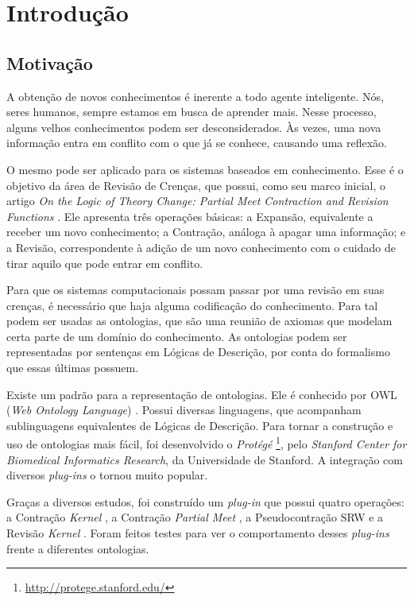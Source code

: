 \chapter{Introdução}

\section{Motivação}

A obtenção de novos conhecimentos é inerente a todo agente inteligente. Nós, seres humanos, sempre estamos em busca de aprender mais. Nesse processo, alguns velhos conhecimentos podem ser desconsiderados. Às vezes, uma nova informação entra em conflito com o que já se conhece, causando uma reflexão.

O mesmo pode ser aplicado para os sistemas baseados em conhecimento. Esse é o objetivo da área de Revisão de Crenças, que possui, como seu marco inicial, o artigo \textit{On the Logic of Theory Change: Partial Meet Contraction and Revision Functions} \citep{revisaoAGM}. Ele apresenta três operações básicas: a Expansão, equivalente a receber um novo conhecimento; a Contração, análoga à apagar uma informação; e a Revisão, correspondente à adição de um novo conhecimento com o cuidado de tirar aquilo que pode entrar em conflito.

Para que os sistemas computacionais possam passar por uma revisão em suas crenças, é necessário que haja alguma codificação do conhecimento. Para tal podem ser usadas as ontologias, que são uma reunião de axiomas que modelam certa parte de um domínio do conhecimento. As ontologias podem ser representadas por sentenças em Lógicas de Descrição, por conta do formalismo que essas últimas possuem.

Existe um padrão para a representação de ontologias. Ele é conhecido por OWL (\textit{Web Ontology Language}) \citep{ferramentasOWL2}. Possui diversas linguagens, que acompanham sublinguagens equivalentes de Lógicas de Descrição. Para tornar a construção e uso de ontologias mais fácil, foi desenvolvido o \textit{Protégé} \footnote{\url{http://protege.stanford.edu/}}, pelo \textit{Stanford Center for Biomedical Informatics Research}, da Universidade de Stanford. A integração com diversos \textit{plug-ins} o tornou muito popular.  

Graças a diversos estudos, foi construído um \textit{plug-in} que possui quatro operações: a Contração \textit{Kernel} \citep{revisaoHansson5}, a Contração \textit{Partial Meet} \citep{revisaoAGM}, a Pseu\-do\-con\-tra\-ção SRW \citep{revisaoSantos} e a Revisão \textit{Kernel} \citep{revisaoRibeiro2}. Foram feitos testes para ver o comportamento desses \textit{plug-ins} frente a diferentes ontologias.

